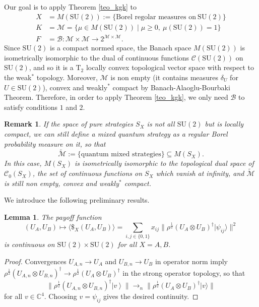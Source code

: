 \documentclass[11pt,a4paper,twoside]{article}
\newcommand{\SU}{\mathrm{SU}}
\newcommand{\ket}[1]{\left| #1 \right\rangle} %
\newtheorem{lemma}[definition]{Lemma}
\newtheorem{rem}[definition]{Remark}
\newenvironment{remark}{\begin{rem}  \rm }{\end{rem}}
\begin{document}
Our goal is to apply Theorem \ref{teo_kgk} to 
\begin{align*}
X &= M(\mathrm{SU(2)}) := \{ \text{Borel regolar measures on}\ \mathrm{SU(2)} \}\\
K &= \mathcal{M} = \{\mu \in M(\mathrm{SU(2)}) \mid \mu \geq 0,\ \mu(\mathrm{SU(2)}) = 1\}\\
F &= \mathcal{B} : \mathcal{M} \times \mathcal{M} \to 2^{\mathcal{M} \times \mathcal{M}}.
\end{align*}
Since $\mathrm{SU(2)}$ is a compact normed space, the Banach space $M(\mathrm{SU(2)})$ is isometrically isomorphic to the dual of continuous functions $\mathcal{C}(\mathrm{SU(2)})$ on $\mathrm{SU(2)}$, and so it is a $\text{T}_2$ locally convex topological vector space with respect to the weak$^*$ topology. Moreover, $\mathcal{M}$ is non empty (it contains measures $\delta_U$ for $U\in\mathrm{SU(2)}$), convex and weakly$^*$ compact by Banach-Alaoglu-Bourbaki Theorem. Therefore, in order to apply Theorem \ref{teo_kgk}, we only need $\mathcal{B}$ to satisfy conditions $1$ and $2$. 

\begin{remark}\rm
If the space of pure strategies $S_X$ is not all $\SU(2)$ but is locally compact, we can still define a mixed quantum strategy as a regular Borel probability measure on it, so that
$$\widetilde{\mathcal{M}}:=\{\mbox{quantum mixed strategies}\}\subseteq M(S_X).
$$
In this case, $M(S_X)$ is isometrically isomorphic to the topological dual space of $\mathcal{C}_0(S_X)$, the set of continuous functions on $S_X$ which vanish at infinity, and $\widetilde{\mathcal{M}}$ is still non empty, convex and weakly$^*$ compact.
\end{remark}
We introduce the following preliminary results.


\begin{lemma}\label{lem:cont}
The payoff function
\[
(U_A,U_B)\longmapsto\langle\$_{X}(U_A,U_B)\rangle
   =\sum_{i,j\in\{0,1\}} x_{ij}\|\rho^\frac{1}{2}(U_A\otimes U_B)^\dagger|\psi_{ij}\rangle\|^2
\]
is continuous on $\SU(2)\times\SU(2)$ for all $X=A,B$.
\end{lemma}

\begin{proof}
Convergences
$U_{A,n}\to U_A$ and $U_{B,n}\to U_B$ in operator norm imply
$\rho^\frac{1}{2}(U_{A,n}\otimes U_{B,n})^\dagger\to \rho^\frac{1}{2}(U_{A}\otimes U_{B})^\dagger$ in the strong operator topology, so that
$$\|\rho^\frac{1}{2}(U_{A,n}\otimes U_{B,n})^\dagger\ket{v}\|\to_n\|\rho^\frac{1}{2}(U_A\otimes U_B)^\dagger|v\rangle\|$$ for all $v\in\mathbb{C}^4$.
Choosing $v=\psi_{ij}$ gives the desired continuity.
\end{proof}
\end{document}
